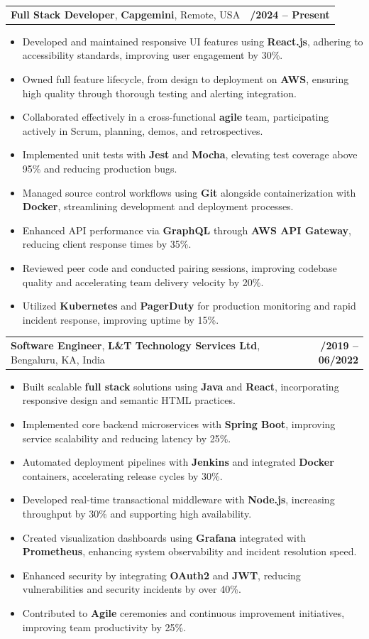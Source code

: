 \documentclass[letterpaper,11pt]{article}
\makeatletter
\newcommand{\resumeItem}[1]{
  \item\footnotesize{
    {#1 \vspace{-2pt}}
  }
}
\newcommand{\resumeSubheading}[4]{
  \vspace{-2pt}\item
    \begin{tabular*}{1.0\textwidth}[t]{l@{\extracolsep{\fill}}r}
      \textbf{\fontsize{10pt}{14pt}\selectfont #3}, \textbf{\fontsize{10pt}{14pt}\selectfont #1}, \fontsize{10pt}{14pt}\selectfont #4 & \textbf{\fontsize{10pt}{14pt}\selectfont #2} \\
    \end{tabular*}\vspace{-7pt}
}
\newcommand{\resumeItemListStart}{\begin{itemize}[leftmargin=*]}
\newcommand{\resumeItemListEnd}{\end{itemize}\vspace{-5pt}}
\makeatother
\begin{document}
    \resumeSubheading
        {Capgemini}{01/2024 -- Present}
        {Full Stack Developer}{Remote, USA}
      \resumeItemListStart
        \resumeItem{Developed and maintained responsive UI features using \textbf{React.js}, adhering to accessibility standards, improving user engagement by 30\%.}
        \resumeItem{Owned full feature lifecycle, from design to deployment on \textbf{AWS}, ensuring high quality through thorough testing and alerting integration.}
        \resumeItem{Collaborated effectively in a cross-functional \textbf{agile} team, participating actively in Scrum, planning, demos, and retrospectives.}
        \resumeItem{Implemented unit tests with \textbf{Jest} and \textbf{Mocha}, elevating test coverage above 95\% and reducing production bugs.}
        \resumeItem{Managed source control workflows using \textbf{Git} alongside containerization with \textbf{Docker}, streamlining development and deployment processes.}
        \resumeItem{Enhanced API performance via \textbf{GraphQL} through \textbf{AWS API Gateway}, reducing client response times by 35\%.}
        \resumeItem{Reviewed peer code and conducted pairing sessions, improving codebase quality and accelerating team delivery velocity by 20\%.}
        \resumeItem{Utilized \textbf{Kubernetes} and \textbf{PagerDuty} for production monitoring and rapid incident response, improving uptime by 15\%.}
      \resumeItemListEnd

    \resumeSubheading
        {L\&T Technology Services Ltd}{08/2019 -- 06/2022}
        {Software Engineer}{Bengaluru, KA, India}
      \resumeItemListStart
        \resumeItem{Built scalable \textbf{full stack} solutions using \textbf{Java} and \textbf{React}, incorporating responsive design and semantic HTML practices.}
        \resumeItem{Implemented core backend microservices with \textbf{Spring Boot}, improving service scalability and reducing latency by 25\%.}
        \resumeItem{Automated deployment pipelines with \textbf{Jenkins} and integrated \textbf{Docker} containers, accelerating release cycles by 30\%.}
        \resumeItem{Developed real-time transactional middleware with \textbf{Node.js}, increasing throughput by 30\% and supporting high availability.}
        \resumeItem{Created visualization dashboards using \textbf{Grafana} integrated with \textbf{Prometheus}, enhancing system observability and incident resolution speed.}
        \resumeItem{Enhanced security by integrating \textbf{OAuth2} and \textbf{JWT}, reducing vulnerabilities and security incidents by over 40\%.}
        \resumeItem{Contributed to \textbf{Agile} ceremonies and continuous improvement initiatives, improving team productivity by 25\%.}
      \resumeItemListEnd
\end{document}
